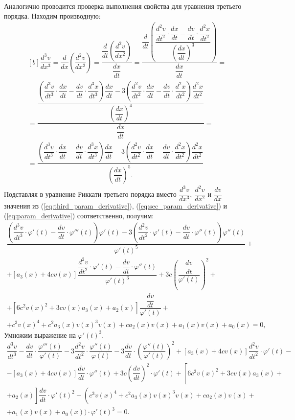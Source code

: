 Аналогично проводится проверка выполнения свойства для уравнения третьего порядка. Находим производную:
\begin{equation}
\begin{aligned}[b]
    \dfrac{d^3v}{dx^3} = \dfrac{d}{dx} \left( \dfrac{d^2v}{dx^2} \right) = \dfrac{\dfrac{d}{dt} \left( \dfrac{d^2v}{dx^2} \right)}{\dfrac{dx}{dt}} = \dfrac{\dfrac{d}{dt} \left(\dfrac{\dfrac{d^2v}{dt^2} \cdot \dfrac{dx}{dt} - \dfrac{dv}{dt} \cdot \dfrac{d^2x}{dt^2}}{\left( \dfrac{dx}{dt} \right)^3}\right)}{\dfrac{dx}{dt}} = \\ = \dfrac{\dfrac{\left( \dfrac{d^3v}{dt^3} \cdot \dfrac{dx}{dt} - \dfrac{dv}{dt} \cdot \dfrac{d^3x}{dt^3} \right) \dfrac{dx}{dt} - 3 \left( \dfrac{d^2v}{dt^2} \cdot \dfrac{dx}{dt} - \dfrac{dv}{dt} \cdot \dfrac{d^2x}{dt^2} \right) \dfrac{d^2x}{dt^2}}{\left( \dfrac{dx}{dt} \right)^4}}{\dfrac{dx}{dt}} = \\ = \dfrac{\left( \dfrac{d^3v}{dt^3} \cdot \dfrac{dx}{dt} - \dfrac{dv}{dt} \cdot \dfrac{d^3x}{dt^3} \right) \dfrac{dx}{dt} - 3 \left( \dfrac{d^2v}{dt^2} \cdot \dfrac{dx}{dt} - \dfrac{dv}{dt} \cdot \dfrac{d^2x}{dt^2} \right) \dfrac{d^2x}{dt^2}}{\left( \dfrac{dx}{dt} \right)^5.}
\end{aligned}  
\label{eq:third_param_derivative}
\end{equation}
Подставляя в уравнение Риккати третьего порядка вместо $\dfrac{d^3v}{dx^3}$, $\dfrac{d^2v}{dx^2}$ и $\dfrac{dv}{dx}$ значения из (\ref{eq:third_param_derivative}), (\ref{eq:sec_param_derivative}) и (\ref{eq:param_derivative}) соответственно, получим:
\begin{multline*}
    \dfrac{\left( \dfrac{d^3v}{dt^3} \cdot \varphi'(t) - \dfrac{dv}{dt} \cdot \varphi'''(t) \right) \varphi'(t) - 3 \left( \dfrac{d^2v}{dt^2} \cdot \varphi'(t) - \dfrac{dv}{dt} \cdot \varphi''(t) \right) \varphi''(t)}{\varphi'(t)^5} + \\ + \left[ a_3(x) + 4c v(x) \right] \dfrac{\dfrac{d^2v}{dt^2} \cdot \varphi'(t) - \dfrac{dv}{dt} \cdot \varphi''(t)}{ \varphi'(t)^3} + 3c \left( \dfrac{\dfrac{dv}{dt}}{\varphi'(t)} \right)^2 + \\ + \left[ 6 c^2 v(x)^2 + 3c v(x) a_3(x) + a_2(x) \right] \dfrac{\dfrac{dv}{dt}}{\varphi'(t)} + \\ + c^3 v(x)^4 + c^2 a_3(x) v(x)^3 v(x) + c a_2(x) v(x) + a_1(x) v(x) + a_0(x) = 0,
\end{multline*}
Умножим выражение на $\varphi'(t)^3$.
\begin{multline*}
    \dfrac{d^3v}{dt^3} - \dfrac{dv}{dt} \cdot \dfrac{\varphi'''(t)}{\varphi'(t)} - 3 \dfrac{d^2v}{dt^2} \cdot \dfrac{\varphi''(t)}{\varphi(t)} - 3 \dfrac{dv}{dt} \cdot \left( \dfrac{\varphi''(t)}{\varphi'(t)} \right)^2  + \left[ a_3(x) + 4c v(x) \right] \dfrac{d^2v}{dt^2} \cdot \varphi'(t) - \\ - \left[ a_3(x) + 4c v(x) \right] \dfrac{dv}{dt} \cdot \varphi''(t) + 3c \left( \dfrac{dv}{dt} \right)^2 \cdot \varphi'(t) + \left[ \right. 6 c^2 v(x)^2 + 3c v(x) a_3(x) + \\ + a_2(x) \left. \right] \dfrac{dv}{dt} \cdot \varphi'(t)^2 + \left( \right. c^3 v(x)^4 + c^2 a_3(x) v(x)^3 v(x) + c a_2(x) v(x) + \\ + a_1(x) v(x) + a_0(x) \big) \cdot  \varphi'(t)^3 = 0.
\end{multline*}
